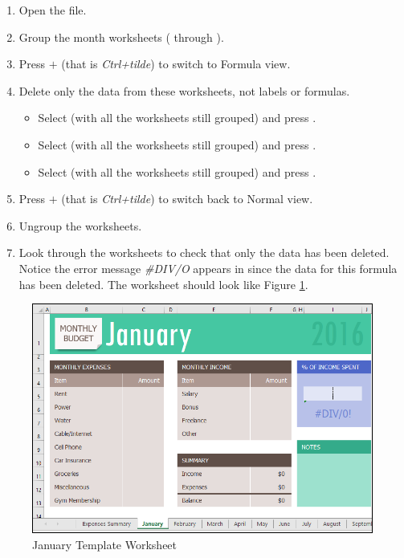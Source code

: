 \begin{enumerate}
	\item Open the  file.
	\item Group the month worksheets ( through ).
	\item Press $+$\fmtKeystroke{$ \sim $} (that is \textit{Ctrl+tilde}) to switch to Formula view.
	\item Delete only the data from these worksheets, not labels or formulas. 

	\begin{itemize}
		\item Select  (with all the worksheets still grouped) and press .
		\item Select  (with all the worksheets still grouped) and press .
		\item Select  (with all the worksheets still grouped) and press .
	\end{itemize}	

\item Press $+$\fmtKeystroke{$ \sim $} (that is \textit{Ctrl+tilde}) to switch back to Normal view.
	\item Ungroup the worksheets. 
	\item Look through the worksheets to check that only the data has been deleted. Notice the error message \textit{\#DIV/O} appears in  since the data for this formula has been deleted. The  worksheet should look like Figure \ref{06:fig10}.
\end{enumerate}

\begin{figure}[H]
	\centering
	\includegraphics[width=\maxwidth{.95\linewidth}]{gfx/ch06_fig10}
	\caption{January Template Worksheet}
	\label{06:fig10}
\end{figure}

